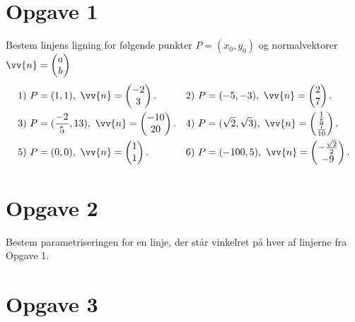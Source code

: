 \section*{Opgave 1}
Bestem linjens ligning for følgende punkter $P = (x_0,y_0)$ og normalvektorer\\ $\vv{n} = \begin{pmatrix}
a \\ b
\end{pmatrix}$
\begin{align*}
&1) \ P = (1,1), \ \vv{n} = \begin{pmatrix}
-2 \\ 3
\end{pmatrix}.   &&2) \ P = (-5,-3), \ \vv{n} = \begin{pmatrix}
2 \\ 7
\end{pmatrix}.    \\
&3) \ P = (\frac{-2}{5},13), \ \vv{n} = \begin{pmatrix}
-10 \\ 20
\end{pmatrix}.   &&4) \ P = (\sqrt{2},\sqrt{3}), \ \vv{n} = \begin{pmatrix}
\frac{1}{5} \\ \frac{7}{10}
\end{pmatrix}.   \\
&5) \ P = (0,0), \ \vv{n} = \begin{pmatrix}
1 \\ 1
\end{pmatrix}.   &&6) \ P = (-100,5), \ \vv{n} = \begin{pmatrix}
-\frac{\sqrt{2}}{2} \\ -9
\end{pmatrix}.   \\
\end{align*}

\section*{Opgave 2}
Bestem parametriseringen for en linje, der står vinkelret på hver af linjerne fra Opgave 1.

\section*{Opgave 3}

